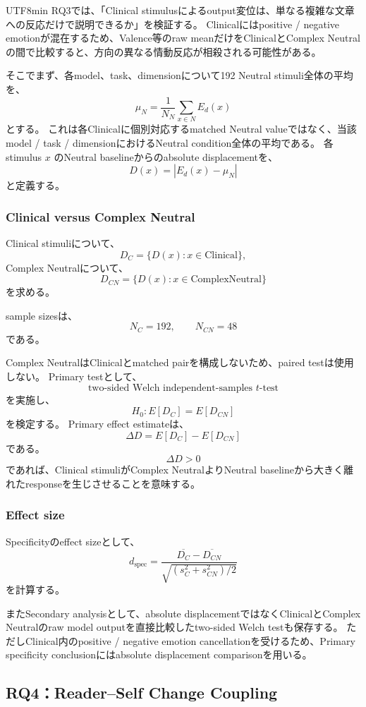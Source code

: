 \documentclass{article} %
\begin{document}
\begin{CJK*}{UTF8}{min}
RQ3では、「Clinical stimulusによるoutput変位は、単なる複雑な文章への反応だけで説明できるか」を検証する。
Clinicalにはpositive / negative emotionが混在するため、Valence等のraw meanだけをClinicalとComplex Neutralの間で比較すると、方向の異なる情動反応が相殺される可能性がある。

そこでまず、各model、task、dimensionについて192 Neutral stimuli全体の平均を、
\[
\mu_N
=
\frac{1}{N_N}
\sum_{x\in N}
E_d(x)
\]
とする。
これは各Clinicalに個別対応するmatched Neutral valueではなく、当該model / task / dimensionにおけるNeutral condition全体の平均である。
各stimulus \(x\) のNeutral baselineからのabsolute displacementを、
\[
D(x)
=
|
E_d(x)-\mu_N
|
\]
と定義する。


\subsubsection{Clinical versus Complex Neutral}

Clinical stimuliについて、
\[
D_C
=
\{
D(x):
x\in\mathrm{Clinical}
\},
\]
Complex Neutralについて、
\[
D_{CN}
=
\{
D(x):
x\in\mathrm{ComplexNeutral}
\}
\]
を求める。

sample sizesは、
\[
N_C=192,
\qquad
N_{CN}=48
\]
である。

Complex NeutralはClinicalとmatched pairを構成しないため、paired testは使用しない。
Primary testとして、
\[
\text{two-sided Welch independent-samples }t\text{-test}
\]
を実施し、
\[
H_0:
E[D_C]=E[D_{CN}]
\]
を検定する。
Primary effect estimateは、
\[
\Delta D
=
E[D_C]-E[D_{CN}]
\]
である。
\[
\Delta D>0
\]
であれば、Clinical stimuliがComplex NeutralよりNeutral baselineから大きく離れたresponseを生じさせることを意味する。


\subsubsection{Effect size}

Specificityのeffect sizeとして、
\[
d_{\mathrm{spec}}
=
\frac{
\overline{D_C}
-
\overline{D_{CN}}
}{
\sqrt{
\left(
s_C^2+s_{CN}^2
\right)/2
}
}
\]
を計算する。

またSecondary analysisとして、absolute displacementではなくClinicalとComplex Neutralのraw model outputを直接比較したtwo-sided Welch testも保存する。
ただしClinical内のpositive / negative emotion cancellationを受けるため、Primary specificity conclusionにはabsolute displacement comparisonを用いる。


\subsection{RQ4：Reader--Self Change Coupling}
\label{app:behavioral-rq4}


\end{CJK*}
\end{document}
